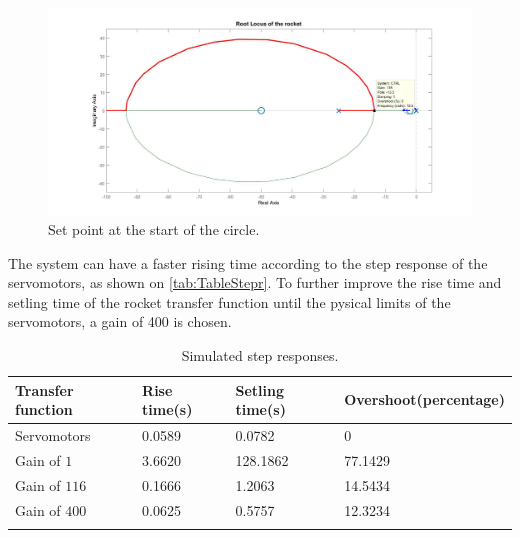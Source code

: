 \begin{figure}[htbp]
	\centering
	
	\includegraphics[width=\textwidth]{figures/Rocket/design/tf_with_controller_1_zoom_v3}
	\caption{Set point at the start of the circle.}
	\label{fig:SystemC1C2Zoom}
	
\end{figure}

The system can have a faster rising time according to the step response of the servomotors, as shown on \autoref{tab:TableStepr}. To further improve the rise time and setling time of the rocket transfer function until the pysical limits of the servomotors, a gain of 400 is chosen. 

\begin{table}[htbp]
	\centering
	\caption{Simulated step responses.}
	\label{tab:TableStepr}
	\begin{tabular}{llll}
		Transfer function & Rise time{(}s{)} & Setling time{(}s{)} & Overshoot{(}percentage{)} \\ \hline  \rowcolor{lightGrey}
		Servomotors     & 0.0589 & 0.0782 & 0\\  
		Gain of $1$     & 3.6620 & 128.1862 & 77.1429  \\  
		\rowcolor{lightGrey}           
		Gain of $116$     & 0.1666 & 1.2063 & 14.5434  \\
		Gain of $400$     & 0.0625 & 0.5757 & 12.3234      \\  
		\rowcolor{lightGrey}     
	\end{tabular}
\end{table}

